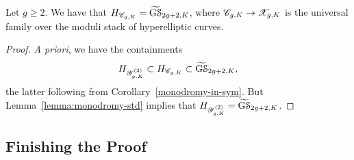 \begin{corollary}
	\label{monodromy-stack} 
	Let $g \geq 2$. We have that $\mono_{\hyperellipticSource g K} = \grouphyp g {K}$,
	where $\hyperellipticSource g K \ra \hyperelliptic g K$ is the universal family over the moduli stack of hyperelliptic curves.
\end{corollary}
\begin{proof}
\emph{A priori}, we have the containments 
\[
\mono_{\standardFamily g 2 K} \subset \mono_{\hyperellipticSource g K} \subset \grouphyp g K, 
\]
the latter following from Corollary~\ref{monodromy-in-sym}. But Lemma~\ref{lemma:monodromy-std} implies that $\mono_{\standardFamily g 2 K} = \grouphyp g K$. 
\end{proof}



\subsection{Finishing the Proof}\label{32isnotagoodscoreline}

